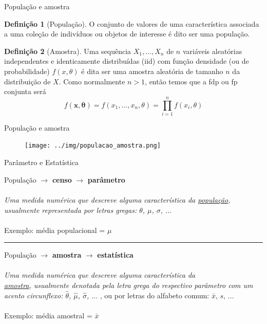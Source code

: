 \documentclass[10pt]{beamer}\usepackage[]{graphicx}\usepackage[]{color}
\newcommand{\bs}[1]{\boldsymbol{#1}}
\theoremstyle{definition}
\newtheorem*{mydef}{Definição}
\begin{document}
\begin{frame}{População e amostra}
  \begin{mydef}[População]
    O  conjunto de valores de uma característica associada a uma coleção
    de indivíduos ou objetos de interesse é dito ser uma população.
  \end{mydef}

  \begin{mydef}[Amostra]
    Uma sequência $X_1, \ldots, X_n$ de $n$ variáveis aleatórias
    independentes e identicamente distribuídas (iid) com função
    densidade (ou de probabilidade) $f(x,\theta)$ é dita ser uma amostra
    aleatória de tamanho $n$ da distribuição de $X$. Como normalmente
    $n>1$, então temos que a fdp ou fp conjunta será
    \begin{equation*}
      f(\bs{x, \theta}) = f(x_1, \ldots, x_n, \theta) = \prod_{i=1}^n
      f(x_i, \theta)
    \end{equation*}
  \end{mydef}
\end{frame}

\begin{frame}{População e amostra}
  \begin{figure}[h]
    \centering
    \texttt{[image: ../img/populacao\_amostra.png]}
  \end{figure}
\end{frame}

\begin{frame}{Parâmetro e Estatística}
  \begin{center}
    População $\rightarrow$ \textbf{censo} $\rightarrow$
    \textbf{parâmetro} \\~\\
    \textsl{Uma medida numérica que descreve alguma
      característica da \underline{população}, usualmente representada
      por letras gregas: $\theta$, $\mu$, $\sigma$, $\ldots$} \\~\\
    Exemplo: média populacional = $\mu$
  \end{center}
  \vspace{1em}
  \hrule
  \vspace{1em}
  \begin{center}
    População $\rightarrow$ \textbf{amostra} $\rightarrow$
    \textbf{estatística}  \\~\\
    \textsl{Uma medida numérica que descreve alguma
      característica da \\ \underline{amostra}, usualmente denotada pela
    letra grega do respectivo parâmetro com um acento circunflexo:
    $\hat\theta$, $\hat\mu$, $\hat\sigma$, $\ldots$} , ou por letras do
  alfabeto comum: $\bar x$, $s$, $\ldots$\\~\\
    Exemplo: média amostral = $\bar{x}$
  \end{center}
\end{frame}
\end{document}
